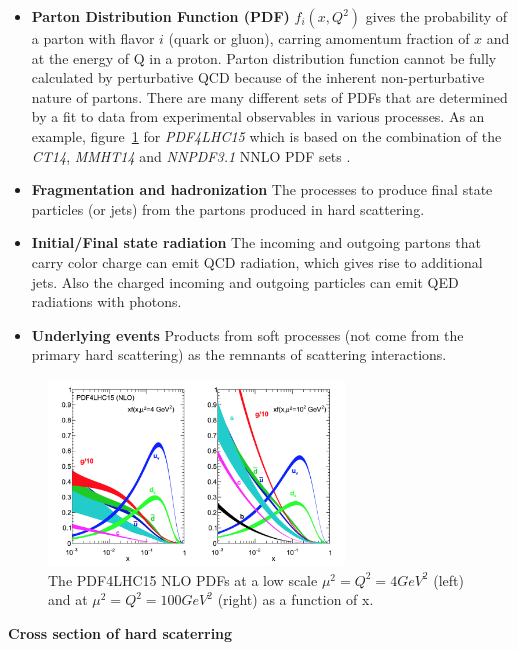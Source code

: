 \begin{itemize}
	\item \textbf{Parton Distribution Function (PDF)} $f_{i}\left(x, Q^{2}\right)$ gives the probability of a parton with flavor $i$ (quark or gluon), carring amomentum fraction of $x$ and at the energy of Q in a proton. Parton distribution function cannot be fully calculated by perturbative QCD because of the inherent non-perturbative nature of partons. There are many different sets of PDFs that are determined by a fit to data from experimental observables in various processes. As an example, figure~\ref{fig:C2_PDF4LHC15} for \textit{PDF4LHC15} which is based on the combination of the \textit{CT14}, \textit{MMHT14} and \textit{NNPDF3.1} NNLO PDF sets \cite{Lin:2017snn}.
	\item \textbf{Fragmentation and hadronization} The processes to produce final state particles (or jets) from the partons produced in hard scattering.
	\item \textbf{Initial/Final state radiation} The incoming and outgoing partons that carry color charge can emit QCD radiation, which gives rise to additional jets. Also the charged incoming and outgoing particles can emit QED radiations with photons.
	\item \textbf{Underlying events} Products from soft processes (not come from the primary hard scattering) as the remnants of scattering interactions.
\end{itemize}
\begin{figure}[!htb]
  \centering
  \includegraphics[width=0.7\textwidth]{figures/Theory/PDF4LHC15.png}
  \caption{The PDF4LHC15 NLO PDFs at a low scale $\mu^{2} = Q^{2} = 4 GeV^{2}$ (left) and at $\mu^{2} = Q^{2} = 100 GeV^{2}$ (right) as a function of x.}
  \label{fig:C2_PDF4LHC15}
\end{figure}

\textbf{Cross section of hard scaterring} 

